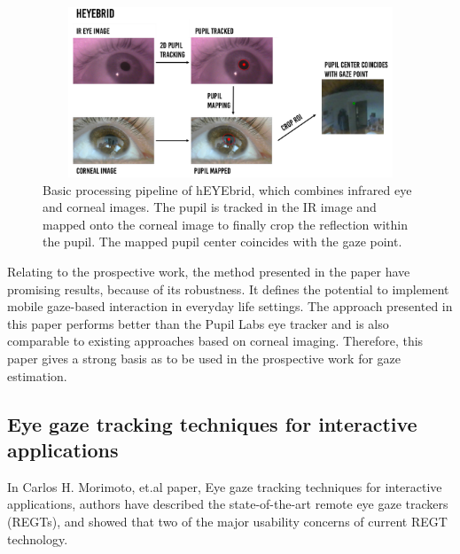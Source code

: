 \begin{figure}[!hbt]
  \centering
  \includegraphics[width=4.5in,height=2in]{lander2.png}
  \caption{Basic processing pipeline of hEYEbrid, which combines infrared eye and corneal images. The pupil is tracked in the IR image and mapped onto the corneal image to finally crop the reflection within the pupil. The mapped pupil center coincides with the gaze point.}
  \label{lander2}
\end{figure}


Relating to the prospective work, the method presented in the paper have promising results, because of its robustness. It defines the potential to implement mobile gaze-based interaction in everyday life settings. The approach presented in this paper performs better than the Pupil Labs \cite{29} eye tracker and is also comparable to existing approaches based on corneal imaging. Therefore, this paper gives a strong basis as to be used in the prospective work for gaze estimation.


\subsection{Eye gaze tracking techniques for interactive applications}

In Carlos H. Morimoto, et.al \cite{15} paper, Eye gaze tracking techniques for interactive applications, authors have described the state-of-the-art remote eye gaze trackers (REGTs), and showed that two of the major usability concerns of current REGT technology. 

